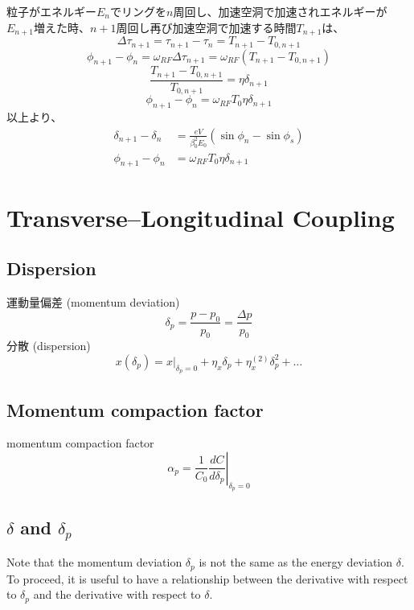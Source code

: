 \documentclass[10pt,a4paper]{ltjsarticle}
\begin{document}
粒子がエネルギー$E_n$でリングを$n$周回し、加速空洞で加速されエネルギーが$E_{n+1}$増えた時、$n+1$周回し再び加速空洞で加速する時間$T_{n+1}$は、
%
\begin{equation}
    \Delta \tau_{n+1} = \tau_{n+1} - \tau_{n} = T_{n+1} - T_{0,n+1}
\end{equation}
%
\begin{equation}
    \phi_{n+1} - \phi_{n} = \omega_{RF} \Delta\tau_{n+1} = \omega_{RF} (T_{n+1}-T_{0,n+1})
\end{equation}
%
\begin{equation}
    \frac{T_{n+1}-T_{0,n+1}}{T_{0,n+1}} = \eta \delta_{n+1}
\end{equation}
%
\begin{equation}
    \phi_{n+1} - \phi_{n} = \omega_{RF} T_0 \eta \delta_{n+1}
\end{equation}
%
以上より、
%
\begin{align}
    \delta_{n+1} - \delta_n &= \frac{e V}{\beta_0^2 E_0}(\sin\phi_n -\sin\phi_s) \\
    \phi_{n+1} - \phi_{n} &= \omega_{RF} T_0 \eta \delta_{n+1}
\end{align}
%
\section{Transverse–Longitudinal Coupling}
\subsection{Dispersion}
運動量偏差 (momentum deviation)
%
\begin{equation}
    \delta_p = \frac{p-p_0}{p_0}=\frac{\Delta p}{p_0}
\end{equation}
%
分散 (dispersion)
%
\begin{equation}
    x(\delta_p) = \left. x \right|_{\delta_p = 0} + \eta_x \delta_p + \eta_x^{(2)}\delta_p^2 + \dots
\end{equation}
%
\subsection{Momentum compaction factor}
momentum compaction factor
%
\begin{equation}
    \alpha_p = \frac{1}{C_0}\left.\frac{dC}{d\delta_p}\right|_{\delta_p = 0}
\end{equation}
%
\subsection{$\delta$ and $\delta_p$}
Note that the momentum deviation $\delta_p$ is not the same as the energy deviation $\delta$. To proceed, it is useful to have a relationship between the derivative with respect to $\delta_p$ and the derivative with respect to $\delta$.
%
\end{document}
